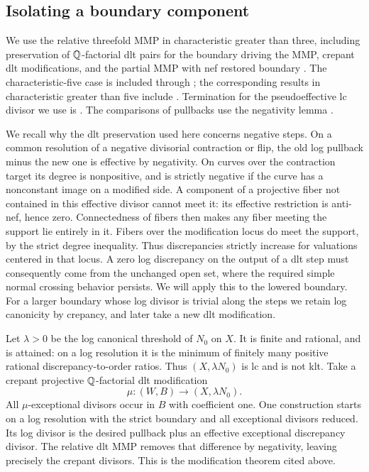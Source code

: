 \subsection{Isolating a boundary component}

We use the relative threefold MMP in characteristic greater than three,
including preservation of \(\mathbb Q\)-factorial dlt pairs for the boundary
driving the MMP, crepant dlt modifications, and the partial MMP with
nef restored boundary
\cite[Theorem~2.20, Proposition~2.21, Definition~2.23,
Lemma~2.24, and Theorem~2.27]{xu2026}.
The characteristic-five case is included through \cite{hw2022};
the corresponding results in characteristic greater than five include
\cite{hnt2020}.  Termination for the pseudoeffective lc divisor we use
is \cite[Theorem~1.5]{xu2024}.
The comparisons of pullbacks use the negativity lemma
\cite[Lemma~3.39]{kollarMori1998}.

We recall why the dlt preservation used here concerns negative steps.
On a common resolution of a negative divisorial contraction or flip,
the old log pullback minus the new one is effective by negativity.
On curves over the contraction target its degree is nonpositive, and
is strictly negative if the curve has a nonconstant image on a modified
side.  A component of a projective fiber not contained in this effective
divisor cannot meet it: its effective restriction is anti-nef, hence zero.
Connectedness of fibers then makes any fiber meeting the support lie
entirely in it.  Fibers over the modification locus do meet the support,
by the strict degree inequality.  Thus discrepancies strictly increase
for valuations centered in that locus.  A zero log discrepancy on the
output of a dlt step must consequently come from the unchanged open set,
where the required simple normal crossing behavior persists.
We will apply this to the lowered boundary.  For a larger boundary whose
log divisor is trivial along the steps we retain log canonicity by
crepancy, and later take a new dlt modification.

Let \(\lambda>0\) be the log canonical threshold of \(N_0\) on \(X\).
It is finite and rational, and is attained: on a log resolution it is
the minimum of finitely many positive rational discrepancy-to-order
ratios.  Thus \((X,\lambda N_0)\) is lc and is not klt.
Take a crepant projective \(\mathbb Q\)-factorial dlt modification
\[
 \mu:(W,B)\longrightarrow(X,\lambda N_0).
\]
All \(\mu\)-exceptional divisors occur in \(B\) with coefficient one.
One construction starts on a log resolution with the strict boundary
and all exceptional divisors reduced.  Its log divisor is the desired
pullback plus an effective exceptional discrepancy divisor.  The relative
dlt MMP removes that difference by negativity, leaving precisely the
crepant divisors.  This is the modification theorem cited above.

